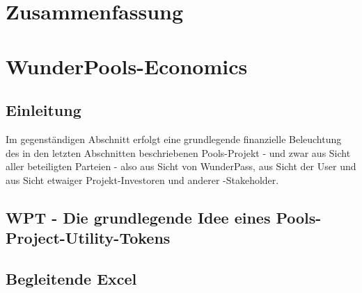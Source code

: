 \documentclass[11pt]{scrartcl}
\begin{document}
\section{Zusammenfassung}
\label{sec:zusammenfassung}
\vspace{0.3cm}


\section{WunderPools-Economics}
\vspace{0.3cm}


\subsection{Einleitung}
\vspace{0.2cm}

Im gegenständigen Abschnitt erfolgt eine grundlegende finanzielle Beleuchtung des in den letzten Abschnitten beschriebenen Pools-Projekt - und zwar aus Sicht aller beteiligten Parteien - also aus Sicht von WunderPass, aus Sicht der User und aus Sicht etwaiger Projekt-Investoren und anderer -Stakeholder.

\vspace{0.1cm}

\vspace{0.5cm}

\subsection{WPT - Die grundlegende Idee eines Pools-Project-Utility-Tokens}
\label{sec:wpt-design}
\vspace{0.2cm}
%
\vspace{0.5cm}

\subsection{Begleitende Excel}
\label{sec:excel}
\vspace{0.2cm}
\vspace{0.5cm}
\end{document}
